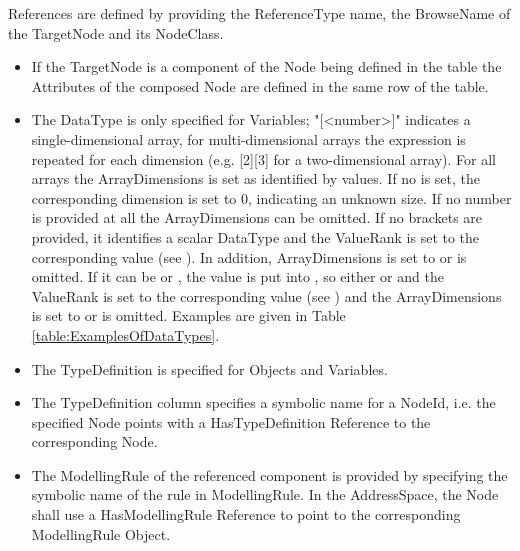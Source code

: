 \glspl{Reference} are defined by providing the \gls{ReferenceType} name, the \gls{BrowseName} of the \gls{TargetNode} and its \gls{NodeClass}.

\begin{itemize}
    \item If the \gls{TargetNode} is a component of the \gls{Node} being defined in the table the \glspl{Attribute} of the composed Node are defined in the same row of the table. 
    \item The \gls{DataType} is only specified for Variables; "[<number>]" indicates a single-dimensional array, for multi-dimensional arrays the expression is repeated for each dimension (e.g. [2][3] for a two-dimensional array). For all arrays the \glspl{ArrayDimension} is set as identified by  values. If no  is set, the corresponding dimension is set to 0, indicating an unknown size. If no number is provided at all the \glspl{ArrayDimension} can be omitted. If no brackets are provided, it identifies a scalar \gls{DataType} and the \gls{ValueRank} is set to the corresponding value (see \cite{UAPart3}). In addition, \glspl{ArrayDimension} is set to  or is omitted. If it can be  or , the value is put into , so either  or  and the \gls{ValueRank} is set to the corresponding value (see \cite{UAPart3}) and the \glspl{ArrayDimension} is set to  or is omitted. Examples are given in Table \ref{table:ExamplesOfDataTypes}.
    \item The \gls{TypeDefinition} is specified for \glspl{Object} and \glspl{Variable}.
    \item The \gls{TypeDefinition} column specifies a symbolic name for a \gls{NodeId}, i.e. the specified \gls{Node} points with a \gls{HasTypeDefinition} \gls{Reference} to the corresponding \gls{Node}.
    \item The \gls{ModellingRule} of the referenced component is provided by specifying the symbolic name of the rule in \gls{ModellingRule}. In the \gls{AddressSpace}, the \gls{Node} shall use a \gls{HasModellingRule} \gls{Reference} to point to the corresponding \gls{ModellingRule} \gls{Object}.
\end{itemize}

